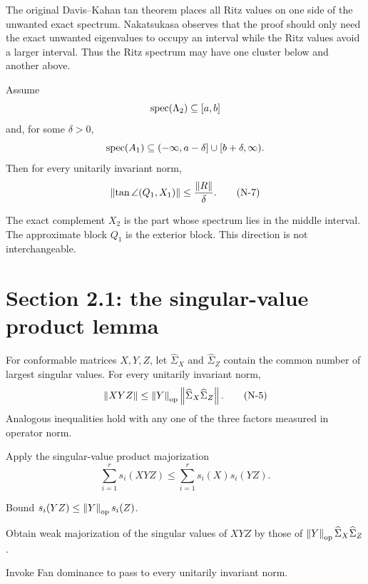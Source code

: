 The original Davis--Kahan tan theorem places all Ritz values on one side of the unwanted exact spectrum. Nakatsukasa observes that the proof should only need the exact unwanted eigenvalues to occupy an interval while the Ritz values avoid a larger interval. Thus the Ritz spectrum may have one cluster below and another above.

\begin{theorem}
Assume
\[
  \operatorname{spec}(\Lambda_2)\subseteq[a,b]
\]
and, for some $\delta>0$,
\[
  \operatorname{spec}(A_1)
  \subseteq(-\infty,a-\delta]\cup[b+\delta,\infty).
\]
Then for every unitarily invariant norm,
\begin{equation}
  \left\lVert \tan\angle(Q_1,X_1)\right\rVert
  \le\frac{\left\lVert R\right\rVert}{\delta}.
  \tag{N-7}\label{N-7}
\end{equation}
\end{theorem}

The exact complement $X_2$ is the part whose spectrum lies in the middle interval. The approximate block $Q_1$ is the exterior block. This direction is not interchangeable.

\section{Section 2.1: the singular-value product lemma}


For conformable matrices $X,Y,Z$, let $\widehat\Sigma_X$ and $\widehat\Sigma_Z$ contain the common number of largest singular values. For every unitarily invariant norm,
\begin{equation}
  \left\lVert XYZ\right\rVert
  \le \left\lVert Y\right\rVert_{\mathrm{op}}
      \left\lVert \widehat\Sigma_X\widehat\Sigma_Z\right\rVert.
  \tag{N-5}
\end{equation}
Analogous inequalities hold with any one of the three factors measured in operator norm.

\begin{proofoutline}
\item Apply the singular-value product majorization
\[
  \sum_{i=1}^r s_i(XYZ)
  \le\sum_{i=1}^r s_i(X)s_i(YZ).
\]
\item Bound $s_i(YZ)\le\left\lVert Y\right\rVert_{\mathrm{op}}s_i(Z)$.
\item Obtain weak majorization of the singular values of $XYZ$ by those of
$\left\lVert Y\right\rVert_{\mathrm{op}}\widehat\Sigma_X\widehat\Sigma_Z$.
\item Invoke Fan dominance to pass to every unitarily invariant norm.
\end{proofoutline}

